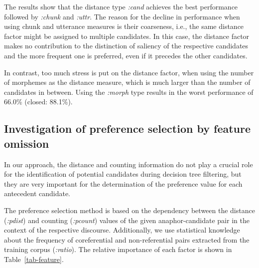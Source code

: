 The results show that the distance type {\em :cand} achieves the best performance followed by
{\em :chunk} and {\em :uttr}. The reason for the decline in performance when using chunk and
utterance measures is their coarseness, i.e., the same distance factor might be assigned to multiple candidates.
In this case, the distance factor makes no contribution to the distinction of saliency of the
respective candidates and the more frequent one is preferred, even if it precedes the other candidates.

In contrast, too much stress is put on the distance factor, when using the number of morphemes as
the distance measure, which is much larger than the number of candidates in between. Using the
{\em :morph} type results in the worst performance of 66.0\% (closed: 88.1\%).

\subsection{Investigation of preference selection by feature omission}
\label{feature-pref}

In our approach, the distance and counting information do not play a crucial role
for the identification of potential candidates during decision tree filtering, but 
they are very important for the determination of the preference value for each antecedent candidate.

The preference selection method is based on the dependency between the distance ({\em :pdist}) and
counting ({\em :pcount}) values of the given anaphor-candidate pair in the context of the respective
discourse. Additionally, we use statistical knowledge about the frequency of coreferential
and non-referential pairs extracted from the training corpus ({\em :ratio}).
The relative importance of each factor is shown in Table~\ref{tab-feature}.

